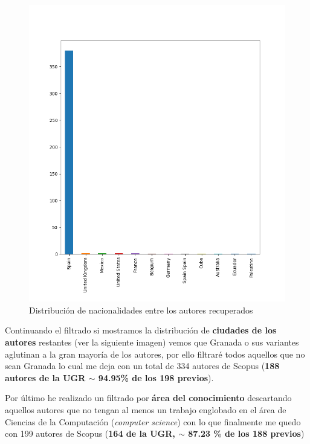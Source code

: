 \begin{figure}[h!]
	
	\centering
	\includegraphics[width=0.9\linewidth]{imagenes/country_hist}
	\caption{Distribución de nacionalidades entre los autores recuperados}
\end{figure}

Continuando el filtrado si mostramos la distribución de \textbf{ciudades de los autores} restantes (ver la siguiente imagen) vemos que Granada o sus variantes aglutinan a la gran mayoría de los autores, por ello filtraré todos aquellos que no sean Granada lo cual me deja con un total de 334 autores de Scopus (\textbf{188 autores de la \acrshort{UGR} $\sim$ 94.95\% de los 198 previos}).

Por último he realizado un filtrado por \textbf{área del conocimiento} descartando aquellos autores que no tengan al menos un trabajo englobado en el área de Ciencias de la Computación (\textit{computer science}) con lo que finalmente me quedo con 199 autores de Scopus (\textbf{164 de la \acrshort{UGR}, $\sim$ 87.23 \% de los 188 previos})

